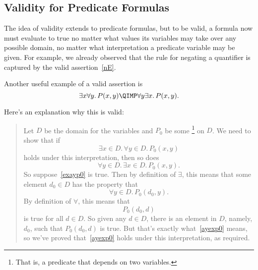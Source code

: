 \iffalse
Logicians have worked very hard to define strict rules for the
use of logic notation so that ideas can be expressed with absolute rigor.
It's all quite charming and clever.  However, the sad irony is that
applied mathematicans usually use their beloved notation as a crude
shorthand, breaking the rules and abusing the notation willy-nilly ---sort
of like pounding nails with fine china.
\fi

\subsection{Validity for Predicate Formulas}

\iffalse
A propositional formula is called \term{valid} when it evaluates to \true\
no matter what truth values are assigned to the individual propositional
variables.  For example, the propositional version of the \idx{Distributive Law}
is that $P \QAND (Q \QOR R)$ is equivalent to $(P \QAND Q) \QOR (P \QAND
R)$.  This is the same as saying that
\[
[P \QAND (Q \QOR R)] \QIFF [(P \QAND Q) \QOR (P \QAND R)]
\]
is valid.
\fi

The idea of validity extends to predicate formulas, but to be valid, a
formula now must evaluate to true no matter what values its variables
may take over any possible domain, no matter what interpretation a
predicate variable may be given.  For example, we already observed
that the rule for negating a quantifier is captured by the valid
assertion~\eqref{nE}.

Another useful example of a valid assertion is
\begin{equation}\label{eaimpliesae}
\exists x \forall y.\, P(x,y) \QIMP \forall y \exists x.\, P(x,y).
\end{equation}

Here's an explanation why this is valid:

\begin{quote}
Let $D$ be the domain for the variables and $P_0$ be some
\footnote{That is, a predicate that depends on two variables.}
on $D$.  We need to show that if
\begin{equation}\label{exayp0}
\exists x \in D.\, \forall y \in D.\, P_0(x,y)
\end{equation}
holds under this interpretation, then so does
\begin{equation}\label{ayexp0}
\forall y \in D.\, \exists x \in D.\, P_0(x,y).
\end{equation}
So suppose~\eqref{exayp0} is true.  Then by definition of $\exists$, this
means that some element $d_0 \in D$ has the property that
\[
\forall y \in D.\, P_0(d_0, y).
\]
By definition of $\forall$, this means that
\[
P_0(d_0,d)
\]
is true for all $d \in D$.  So given any $d \in D$, there is an element in
$D$, namely, $d_0$, such that $P_0(d_0,d)$ is true.  But that's exactly
what~\eqref{ayexp0} means, so we've proved that~\eqref{ayexp0} holds under
this interpretation, as required.
\end{quote}

